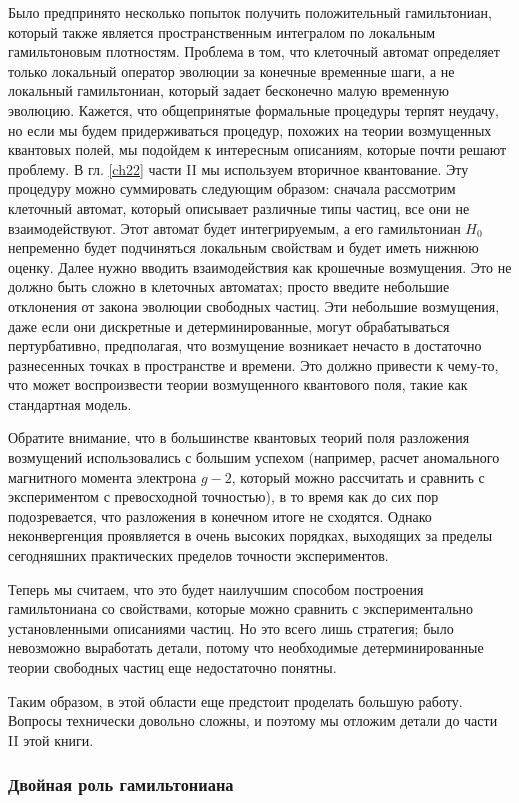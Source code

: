 \documentclass[main.tex]{subfiles}
\begin{document}
Было предпринято несколько попыток получить положительный гамильтониан, который также является пространственным интегралом по локальным гамильтоновым плотностям. Проблема в том, что клеточный автомат определяет только локальный оператор эволюции за конечные временные шаги, а не локальный гамильтониан, который задает бесконечно малую временную эволюцию. Кажется, что общепринятые формальные процедуры терпят неудачу, но если мы будем придерживаться процедур, похожих на теории возмущенных квантовых полей, мы подойдем к интересным описаниям, которые почти решают проблему. В гл. \ref{ch22} части II мы используем вторичное квантование. Эту процедуру можно суммировать следующим образом: сначала рассмотрим клеточный автомат, который описывает различные типы частиц, все они не взаимодействуют. Этот автомат будет интегрируемым, а его гамильтониан $H_0$ непременно будет подчиняться локальным свойствам и будет иметь нижнюю оценку. Далее нужно вводить взаимодействия как крошечные возмущения. Это не должно быть сложно в клеточных автоматах; просто введите небольшие отклонения от закона эволюции свободных частиц. Эти небольшие возмущения, даже если они дискретные и детерминированные, могут обрабатываться пертурбативно, предполагая, что возмущение возникает нечасто в достаточно разнесенных точках в пространстве и времени. Это должно привести к чему-то, что может воспроизвести теории возмущенного квантового поля, такие как стандартная модель.

Обратите внимание, что в большинстве квантовых теорий поля разложения возмущений использовались с большим успехом (например, расчет аномального магнитного момента электрона $g - 2$, который можно рассчитать и сравнить с экспериментом с превосходной точностью), в то время как до сих пор подозревается, что разложения в конечном итоге не сходятся. Однако неконвергенция проявляется в очень высоких порядках, выходящих за пределы сегодняшних практических пределов точности экспериментов.

Теперь мы считаем, что это будет наилучшим способом построения гамильтониана со свойствами, которые можно сравнить с экспериментально установленными описаниями частиц. Но это всего лишь стратегия; было невозможно выработать детали, потому что необходимые детерминированные теории свободных частиц еще недостаточно понятны.

Таким образом, в этой области еще предстоит проделать большую работу. Вопросы технически довольно сложны, и поэтому мы отложим детали до части II этой книги.

\subsubsection{Двойная роль гамильтониана}\label{ch5.6.2}
\end{document}
